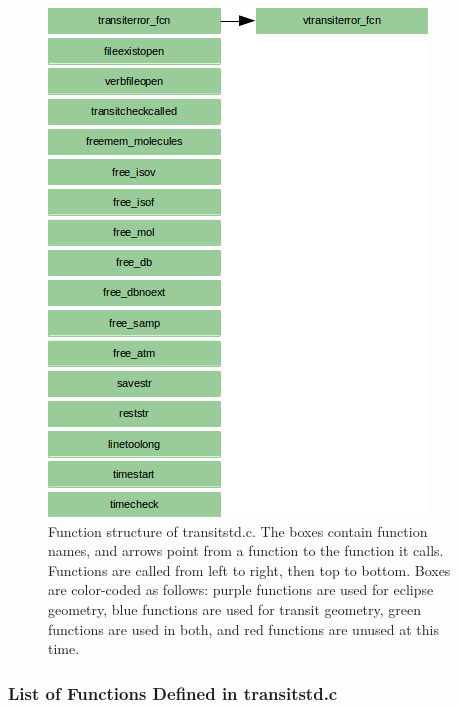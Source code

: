 \documentclass[letterpaper,12pt]{article}
\begin{document}
\begin{figure}
\includegraphics{fig/transitstdc}
\caption{Function structure of transitstd.c. The boxes contain function names, and arrows point from a function to the function it calls. Functions are called from left to right, then top to bottom.  Boxes are color-coded as follows:  purple functions are used for eclipse geometry, blue functions are used for transit geometry, green functions are used in both, and red functions are unused at this time.}
\label{fig:transitstdc}
\end{figure}

\subsubsection{List of Functions Defined in transitstd.c}
 \newline

 \newline

 \newline
\end{document}
